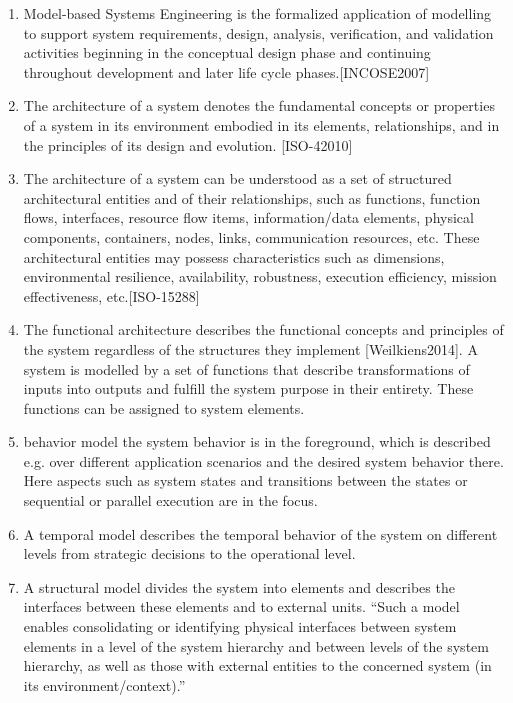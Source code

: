 \begin{enumerate}

\item Model-based Systems Engineering is the formalized application of modelling to support system requirements, design, analysis, verification, and validation activities beginning in the conceptual design phase and continuing throughout development and later life cycle phases.[INCOSE2007]

\item The architecture of a system denotes the fundamental concepts or properties of a system in its environment embodied in its elements, relationships, and in the principles of its design and evolution. [ISO-42010]

\item The architecture of a system can be understood as a set of structured
architectural entities and of their relationships, such as functions, function flows, interfaces, resource flow items,
information/data elements, physical components, containers, nodes, links, communication resources, etc. These architectural
entities may possess characteristics such as dimensions, environmental resilience, availability, robustness, execution
efficiency, mission effectiveness, etc.[ISO-15288]

\item The functional architecture describes the functional concepts and principles of the system regardless of the
structures they implement [Weilkiens2014]. A system is modelled by a set of functions that describe
transformations of inputs into outputs and fulfill the system purpose in their entirety. These functions can be
assigned to system elements.

\item behavior model the system behavior is in the foreground, which is described e.g. over different
application scenarios and the desired system behavior there. Here aspects such as system states and
transitions between the states or sequential or parallel execution are in the focus.

\item A temporal model describes the temporal behavior of the system on different levels from strategic decisions to
the operational level.

\item A structural model divides the system into elements and describes the interfaces between these elements and
to external units. “Such a model enables consolidating or identifying physical interfaces between system
elements in a level of the system hierarchy and between levels of the system hierarchy, as well as those with
external entities to the concerned system (in its environment/context).”


\end{enumerate}
